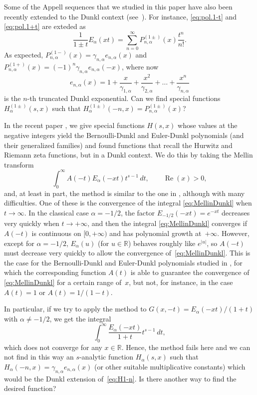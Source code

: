\documentclass[11pt,a4paper]{amsart}
\newcommand{\R}{\mathbb{R}}
\newcommand{\Ea}{E_{\alpha}}
\renewcommand{\Re}{\operatorname{Re}}
\theoremstyle{plain}
\theoremstyle{plain}
\theoremstyle{remark}
\numberwithin{equation}{section}
\begin{document}
Some of the Appell sequences that we studied in this paper have also been recently extended to the Dunkl context (see~\cite{M}). For instance, \eqref{eq:pol.1-t} and \eqref{eq:pol.1+t} are exteded as
\[
  \frac{1}{1\pm t}\Ea(xt) = \sum_{n=0}^{\infty} P^{(1\pm)}_{n,\alpha}(x)\frac{t^n}{n!}.
\]
As expected, $P^{(1-)}_{n,\alpha}(x) = \gamma_{n,\alpha} e_{n,\alpha}(x)$ and $P^{(1+)}_{n,\alpha}(x) = (-1)^n \gamma_{n,\alpha} e_{n,\alpha}(-x)$, where now
\[
  e_{n,\alpha}(x) = 1 + \frac{x}{\gamma_{1,\alpha}} + \frac{x^2}{\gamma_{2,\alpha}} 
  + \dots + \frac{x^n}{\gamma_{n,\alpha}}
\]
is the $n$-th truncated Dunkl exponential.
Can we find special functions $H^{(1\pm)}_\alpha(s,x)$ such that $H^{(1\pm)}_\alpha(-n,x) = P^{(1\pm)}_{n,\alpha}(x)$? 

In the recent paper \cite{GV}, we give special functions $H(s,x)$ whose values at the negative integers yield the Bernoulli-Dunkl and Euler-Dunkl polynomials (and their generalized families) and found functions that recall the Hurwitz and Riemann zeta functions, but in a Dunkl context. We do this by taking the Mellin transform
\begin{equation}
\label{eq:MellinDunkl}
  \int_0^{\infty} A(-t) \Ea(-xt) t^{s-1}\,dt, \qquad \Re(x)>0,
\end{equation}
and, at least in part, the method is similar to the one in \cite[Theorem~1]{NRV}, although with many difficulties. One of these is the convergence of the integral \eqref{eq:MellinDunkl} when $t\to\infty$. In the classical case $\alpha=-1/2$, the factor $E_{-1/2}(-xt) = e^{-xt}$ decreases very quickly when $t \to +\infty$, and then the integral \eqref{eq:MellinDunkl} converges if $A(-t)$ is continuous on $[0, +\infty)$ and has polynomial growth at~$+\infty$. However, except for $\alpha=-1/2$, $\Ea(u)$ (for $u\in\R$) behaves roughly like $e^{|u|}$, so $A(-t)$ must decrease very quickly to allow the convergence of~\eqref{eq:MellinDunkl}. This is the case for the Bernoulli-Dunkl and Euler-Dunkl polynomials studied in \cite{GV}, for which the corresponding function $A(t)$ is able to guarantee the convergence of \eqref{eq:MellinDunkl} for a certain range of~$x$, but not, for instance, in the case $A(t)=1$ or $A(t) = 1/(1-t)$.

In particular, if we try to apply the method to $G(x,-t) = \Ea(-xt)/(1+t)$ with $\alpha\ne-1/2$, we get the integral
\[
  \int_0^{\infty} \frac{\Ea(-xt)}{1+t} t^{s-1}\,dt,
\] 
which does not converge for any $x\in \mathbb{R}$. Hence, the method fails here and we can not find in this way an $s$-analytic function $H_\alpha(s,x)$ such that $H_\alpha(-n,x) = \gamma_{n,\alpha} e_{n,\alpha}(x)$ (or other suitable multiplicative constants) which would be the Dunkl extension of~\eqref{eq:H1-n}.
Is there another way to find the desired function? 
\end{document}
